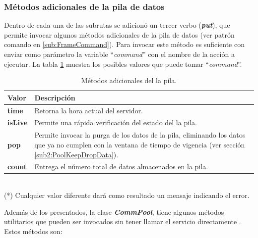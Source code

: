         \subsubsection{Métodos adicionales de la pila de datos}
        \label{sub2:PoolAditional}
            Dentro de cada una de las subrutas se adicionó un tercer verbo (\textbf{\textit{put}}), que permite invocar algunos métodos adicionales de la pila de datos (ver patrón comando en \ref{sub:FrameCommand}). Para invocar este método es suficiente con enviar como parámetro la variable ``\textit{command}'' con el nombre de la acción a ejecutar. La tabla \ref{Tab:PoolPutParams} muestra los posibles valores que puede tomar ``\textit{command}''.
            
            \begin{table}[ht!]
            \caption[Métodos adicionales del la pila]{Métodos adicionales del la pila.}
            \label{Tab:PoolPutParams}
            \centering
            \begin{tabular}{ | l p{11cm} | } 
                \hline
                 \textbf{Valor}               & \textbf{Descripción} \\ 
                \hline\hline
                \textbf{time}     & Retorna la hora actual del servidor. \\
                \hline
                \textbf{isLive} & Permite una rápida verificación del estado del la pila. \\
                \hline
                \textbf{pop}     & Permite invocar la purga de los datos de la pila, eliminando los datos que ya no cumplen con la ventana de tiempo de vigencia (ver sección \ref{sub2:PoolKeepDropData}). \\
                \hline
                \textbf{count}       & Entrega el número total de datos almacenados en la pila. \\
                \hline
            \end{tabular}
            \\{(*) Cualquier valor diferente dará como resultado un mensaje indicando el error.}
            \end{table}
            
            Además de los presentados, la clase \textbf{\textit{CommPool}}, tiene algunos métodos utilitarios que pueden ser invocados sin tener llamar el servicio directamente . Estos métodos son:
            
